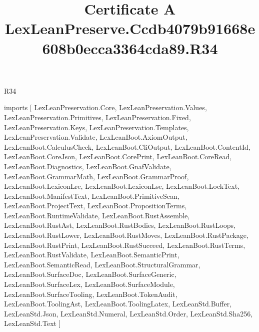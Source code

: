 \begin{lexlean}{R34}
\title{Certificate A LexLeanPreserve.Ccdb4079b91668e608b0ecca3364cda89.R34}
\begin{coremodule}
imports [
  LexLeanPreservation.Core,
  LexLeanPreservation.Values,
  LexLeanPreservation.Primitives,
  LexLeanPreservation.Fixed,
  LexLeanPreservation.Keys,
  LexLeanPreservation.Templates,
  LexLeanPreservation.Validate,
  LexLeanBoot.AxiomOutput,
  LexLeanBoot.CalculusCheck,
  LexLeanBoot.CliOutput,
  LexLeanBoot.ContentId,
  LexLeanBoot.CoreJson,
  LexLeanBoot.CorePrint,
  LexLeanBoot.CoreRead,
  LexLeanBoot.Diagnostics,
  LexLeanBoot.GnafValidate,
  LexLeanBoot.GrammarMath,
  LexLeanBoot.GrammarProof,
  LexLeanBoot.LexiconLre,
  LexLeanBoot.LexiconLse,
  LexLeanBoot.LockText,
  LexLeanBoot.ManifestText,
  LexLeanBoot.PrimitiveScan,
  LexLeanBoot.ProjectText,
  LexLeanBoot.PropositionTerms,
  LexLeanBoot.RuntimeValidate,
  LexLeanBoot.RustAssemble,
  LexLeanBoot.RustAst,
  LexLeanBoot.RustBodies,
  LexLeanBoot.RustLoops,
  LexLeanBoot.RustLower,
  LexLeanBoot.RustMoves,
  LexLeanBoot.RustPackage,
  LexLeanBoot.RustPrint,
  LexLeanBoot.RustSucceed,
  LexLeanBoot.RustTerms,
  LexLeanBoot.RustValidate,
  LexLeanBoot.SemanticPrint,
  LexLeanBoot.SemanticRead,
  LexLeanBoot.StructuralGrammar,
  LexLeanBoot.SurfaceDoc,
  LexLeanBoot.SurfaceGeneric,
  LexLeanBoot.SurfaceLex,
  LexLeanBoot.SurfaceModule,
  LexLeanBoot.SurfaceTooling,
  LexLeanBoot.TokenAudit,
  LexLeanBoot.ToolingAst,
  LexLeanBoot.ToolingLatex,
  LexLeanStd.Buffer,
  LexLeanStd.Json,
  LexLeanStd.Numeral,
  LexLeanStd.Order,
  LexLeanStd.Sha256,
  LexLeanStd.Text
]


\end{coremodule}
\end{lexlean}
